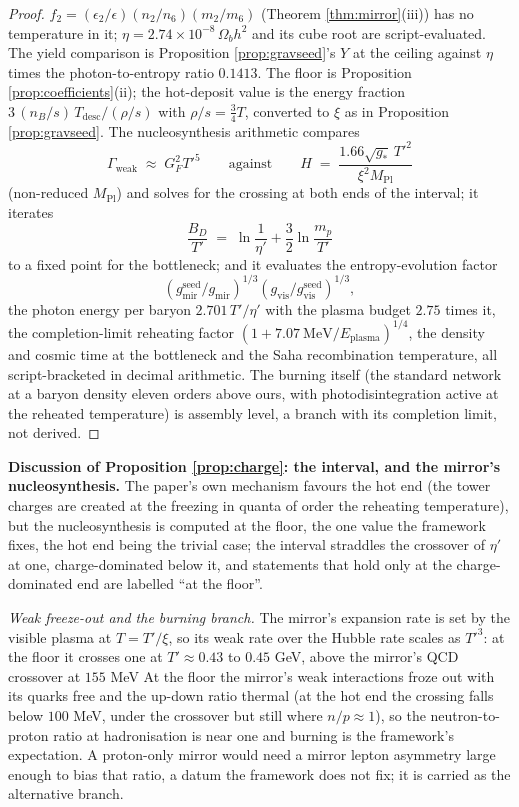 \documentclass[11pt]{article}
\theoremstyle{definition}
\begin{document}
\begin{proof}
$f_{2} = (\epsilon_{2}/\epsilon)(n_{2}/n_{6})(m_{2}/m_{6})$ (Theorem \ref{thm:mirror}(iii)) has no temperature in it; $\eta = 2.74 \times 10^{-8}\,\Omega_{b}h^{2}$ and its cube root are script-evaluated. The yield comparison is Proposition \ref{prop:gravseed}'s $Y$ at the ceiling against $\eta$ times the photon-to-entropy ratio $0.1413$. The floor is Proposition \ref{prop:coefficients}(ii); the hot-deposit value is the energy fraction $3\,(n_{B}/s)\,T_{\mathrm{desc}}/(\rho/s)$ with $\rho/s = \tfrac{3}{4}T$, converted to $\xi$ as in Proposition \ref{prop:gravseed}. The nucleosynthesis arithmetic compares
\[
\Gamma_{\mathrm{weak}} \;\approx\; G_{F}^{2}T'^{5} \qquad\text{against}\qquad H \;=\; \frac{1.66\sqrt{g_{*}}\,T'^{2}}{\xi^{2}M_{\mathrm{Pl}}}
\]
(non-reduced $M_{\mathrm{Pl}}$) and solves for the crossing at both ends of the interval; it iterates
\[
\frac{B_{D}}{T'} \;=\; \ln\frac{1}{\eta'} + \frac{3}{2}\ln\frac{m_{p}}{T'}
\]
to a fixed point for the bottleneck; and it evaluates the entropy-evolution factor
\[
(g_{\mathrm{mir}}^{\mathrm{seed}}/g_{\mathrm{mir}})^{1/3}(g_{\mathrm{vis}}/g_{\mathrm{vis}}^{\mathrm{seed}})^{1/3},
\]
the photon energy per baryon $2.701\,T'/\eta'$ with the plasma budget $2.75$ times it, the completion-limit reheating factor $(1 + 7.07\ \mathrm{MeV}/E_{\mathrm{plasma}})^{1/4}$, the density and cosmic time at the bottleneck and the Saha recombination temperature, all script-bracketed in decimal arithmetic. The burning itself (the standard network at a baryon density eleven orders above ours, with photodisintegration active at the reheated temperature) is assembly level, a branch with its completion limit, not derived.
\end{proof}

\medskip\noindent\textbf{Discussion of Proposition \ref{prop:charge}: the interval, and the mirror's nucleosynthesis.} The paper's own mechanism favours the hot end (the tower charges are created at the freezing in quanta of order the reheating temperature), but the nucleosynthesis is computed at the floor, the one value the framework fixes, the hot end being the trivial case; the interval straddles the crossover of $\eta'$ at one, charge-dominated below it, and statements that hold only at the charge-dominated end are labelled ``at the floor''.

\smallskip\noindent\emph{Weak freeze-out and the burning branch.} The mirror's expansion rate is set by the visible plasma at $T = T'/\xi$, so its weak rate over the Hubble rate scales as $T'^{3}$: at the floor it crosses one at $T' \approx 0.43$ to $0.45$ GeV, above the mirror's QCD crossover at $155$ MeV At the floor the mirror's weak interactions froze out with its quarks free and the up-down ratio thermal (at the hot end the crossing falls below $100$ MeV, under the crossover but still where $n/p \approx 1$), so the neutron-to-proton ratio at hadronisation is near one and burning is the framework's expectation. A proton-only mirror would need a mirror lepton asymmetry large enough to bias that ratio, a datum the framework does not fix; it is carried as the alternative branch.
\end{document}
